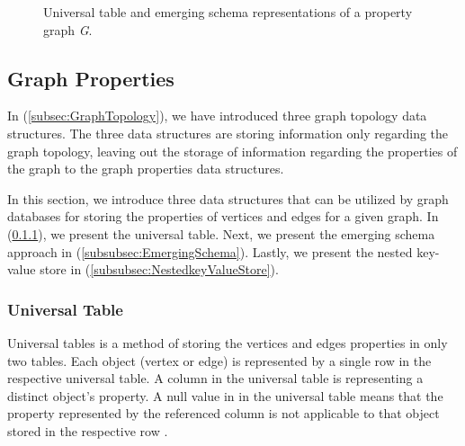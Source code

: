 {\begin{figure}[H]
{        \label{fig:VertexEmergingSchema}
    }
\centering
    \caption{Universal table and emerging schema representations of a property graph \textit{G}.}
    \label{fig:GraphProperties_logical}
\end{figure}

\subsection{Graph Properties}
\label{subsec:GraphProperties}

In (\ref{subsec:GraphTopology}), we have introduced three graph topology data structures. The three data structures are storing information only regarding the graph topology, leaving out the storage of information regarding the properties of the graph to the graph properties data structures. 

In this section, we introduce three data structures that can be utilized by graph databases for storing the properties of vertices and edges for a given graph. In (\ref{subsubsec:UniversalTable}), we present the universal table. Next, we present the emerging schema approach in (\ref{subsubsec:EmergingSchema}). Lastly, we present the nested key-value store in (\ref{subsubsec:NestedkeyValueStore}).

\subsubsection{Universal Table}
\label{subsubsec:UniversalTable}

Universal tables is a method of storing the vertices and edges properties in only two tables. Each object (vertex or edge) is represented by a single row in the respective universal table. A column in the universal table is representing a distinct object's property. A null value in in the universal table means that the property represented by the referenced column is not applicable to that object stored in the respective row \cite{Paradies2017}.

}

